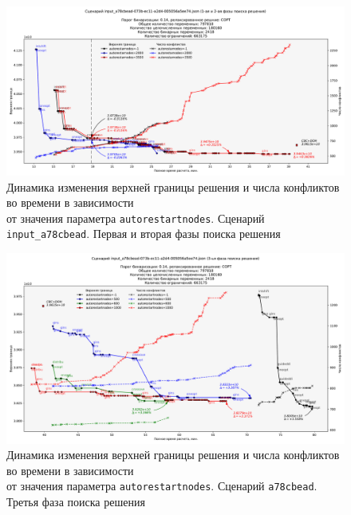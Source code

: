 \documentclass[%
	11pt,
	a4paper,
	utf8,
		]{article}
\begin{document}
\begin{landscape}
	\begin{figure}[!h]
		\centering
		\includegraphics[scale=0.63]{figures/a78cbead_autorestartnodes_1_2_phase.pdf}
		\caption{ Динамика изменения верхней границы решения и числа конфликтов во времени в зависимости \\от значения параметра \texttt{autorestartnodes}. Сценарий \texttt{input\_a78cbead}. Первая и вторая фазы поиска решения }\label{fig:a78cbead_autorestartnodes_1_2_phase}
	\end{figure}
\end{landscape}

\begin{landscape}
\begin{figure}[!h]
	\centering
	\includegraphics[scale=0.63]{figures/a78cbead_autorestartnodes_3_phase.pdf}
	\caption{ Динамика изменения верхней границы решения и числа конфликтов во времени в зависимости \\от значения параметра \texttt{autorestartnodes}. Сценарий \texttt{a78cbead}. Третья фаза поиска решения }\label{fig:a78cbead_autorestartnodes_3_phase}
\end{figure}
\end{landscape}
\end{document}
